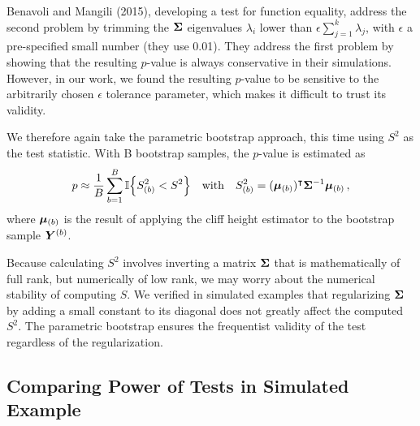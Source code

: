	Benavoli and Mangili (2015), developing a test for function equality, address the second problem by trimming the \(\bm{\Sigma}\) eigenvalues \(\lambda_i\) lower than \(\epsilon \sum_{j=1}^k \lambda_j\), with \(\epsilon\) a pre-specified small number (they use 0.01).
They address the first problem by showing that the resulting \(p\)-value is always conservative in their simulations.
However, in our work, we found the resulting \(p\)-value to be sensitive to the arbitrarily chosen \(\epsilon\) tolerance parameter, which makes it difficult to trust its validity.

	We therefore again take the parametric bootstrap approach, this time using \(S^2\) as the test statistic.
With B bootstrap samples, the \(p\)-value is estimated as
\begin{equation}
        p \approx \frac{1}{B} \sum_{b=1}^B \Ind\cbr{S_{(b)}^2 < S^2}
		\quad\text{with}\quad
        S_{(b)}^2 = (\muvec_{(b)} )\trans \SigmaMat^{-1} \muvec_{(b)}\,,
\end{equation}
where \(\bm{\mu}_{(b)}\) is the result of applying the cliff height estimator  to the bootstrap sample \(\bm{Y}^{(b)}\).

	Because calculating \(S^2\) involves inverting a matrix \(\bm{\Sigma}\) that is mathematically of full rank, but numerically of low rank, we may worry about the numerical stability of computing \(S\).
We verified in simulated examples that regularizing \(\bm{\Sigma}\) by adding a small constant to its diagonal does not greatly affect the computed \(S^2\).
The parametric bootstrap ensures the frequentist validity of the test
regardless of the regularization.


\subsection{Comparing Power of Tests in Simulated Example}
\label{sec:powersim}

